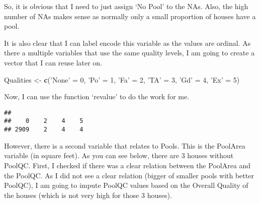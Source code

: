 \documentclass[]{article}
\newenvironment{Shaded}{\begin{snugshade}}{\end{snugshade}}
\newcommand{\DecValTok}[1]{\textcolor[rgb]{0.00,0.00,0.81}{#1}}
\newcommand{\KeywordTok}[1]{\textcolor[rgb]{0.13,0.29,0.53}{\textbf{#1}}}
\newcommand{\NormalTok}[1]{#1}
\newcommand{\OperatorTok}[1]{\textcolor[rgb]{0.81,0.36,0.00}{\textbf{#1}}}
\newcommand{\StringTok}[1]{\textcolor[rgb]{0.31,0.60,0.02}{#1}}
\begin{document}
So, it is obvious that I need to just assign `No Pool' to the NAs. Also,
the high number of NAs makes sense as normally only a small proportion
of houses have a pool.

\begin{Shaded}
\end{Shaded}

It is also clear that I can label encode this variable as the values are
ordinal. As there a multiple variables that use the same quality levels,
I am going to create a vector that I can reuse later on.

\begin{Shaded}
\begin{Highlighting}[]
\NormalTok{Qualities <-}\StringTok{ }\KeywordTok{c}\NormalTok{(}\StringTok{'None'}\NormalTok{ =}\StringTok{ }\DecValTok{0}\NormalTok{, }\StringTok{'Po'}\NormalTok{ =}\StringTok{ }\DecValTok{1}\NormalTok{, }\StringTok{'Fa'}\NormalTok{ =}\StringTok{ }\DecValTok{2}\NormalTok{, }\StringTok{'TA'}\NormalTok{ =}\StringTok{ }\DecValTok{3}\NormalTok{, }\StringTok{'Gd'}\NormalTok{ =}\StringTok{ }\DecValTok{4}\NormalTok{, }\StringTok{'Ex'}\NormalTok{ =}\StringTok{ }\DecValTok{5}\NormalTok{)}
\end{Highlighting}
\end{Shaded}

Now, I can use the function `revalue' to do the work for me.

\begin{Shaded}
\end{Shaded}

\begin{verbatim}
## 
##    0    2    4    5 
## 2909    2    4    4
\end{verbatim}

However, there is a second variable that relates to Pools. This is the
PoolArea variable (in square feet). As you can see below, there are 3
houses without PoolQC. First, I checked if there was a clear relation
between the PoolArea and the PoolQC. As I did not see a clear relation
(bigger of smaller pools with better PoolQC), I am going to impute
PoolQC values based on the Overall Quality of the houses (which is not
very high for those 3 houses).
\end{document}
